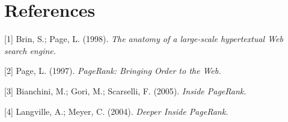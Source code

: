 \documentclass[%
    final,
    notitlepage,
    narroweqnarray,
    inline,
    twoside,
    invited
    ]{ieee}
\begin{document}
%
%
%
%
%

\newpage

\section{References}

    [1] Brin, S.; Page, L. (1998). \emph{The anatomy of a large-scale hypertextual Web search engine.}

    [2] Page, L. (1997). \emph{PageRank: Bringing Order to the Web.}

    [3] Bianchini, M.; Gori, M.; Scarselli, F. (2005). \emph{Inside PageRank.}

    [4] Langville, A.; Meyer, C. (2004). \emph{Deeper Inside PageRank.}
\end{document}
